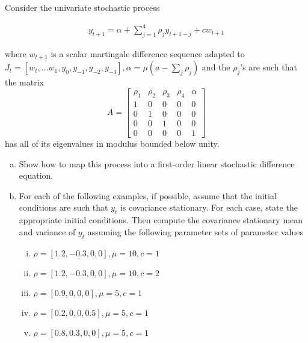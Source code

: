 \documentclass{homework}
\begin{document}
\begin{homeworkProblem}[Problem 2.4]

  Consider the univariate stochastic process

  \begin{align}
    \label{eq:stoch2.4}
    y_{t+1} = \alpha + \sum_{j=1}^4 \rho_j y_{t+1 - j} + c w_{t+1}
  \end{align}

  where $w_{t+1}$ is a scalar martingale difference sequence adapted to $J_t = \left[ w_t, \dots w_1, y_0, y_{-1}, y_{-2}, y_{-3} \right], \alpha = \mu \left( a - \sum_j \rho_j \right) $ and the $\rho_j$'s are such that the matrix
  $$A = \begin{bmatrix}
  \rho_1 & \rho_2 & \rho_3 & \rho_4 & \alpha \\
  1 &0 & 0 & 0 & 0 \\
  0 & 1 & 0 & 0 & 0 \\
   0 & 0 & 1 & 0 & 0 \\
   0 & 0 & 0 & 0 & 1
   \end{bmatrix}$$ has all of its eigenvalues in modulus bounded below unity.

   \begin{enumerate}[a.]
     \item Show how to map this process into a first-order linear stochastic difference equation.

     \item For each of the following examples, if possible, assume that the initial conditions are such that $y_t$ is covariance stationary. For each case, state the appropriate initial conditions. Then compute the covariance stationary mean and variance of $y_t$ assuming the following parameter sets of parameter values
       \begin{enumerate}[i.]
         \item $\rho = \left[ 1.2, -0.3, 0, 0 \right], \mu = 10,  c = 1$
         \item $\rho = \left[ 1.2, -0.3, 0, 0 \right], \mu = 10,  c = 2$
         \item $\rho = \left[ 0.9, 0, 0, 0 \right], \mu = 5,  c = 1$
         \item $\rho = \left[ 0.2, 0, 0, 0.5 \right], \mu = 5,  c = 1$
         \item $\rho = \left[ 0.8, 0.3, 0, 0 \right], \mu = 5,  c = 1$
       \end{enumerate}


\end{enumerate}
\end{homeworkProblem}
\end{document}
